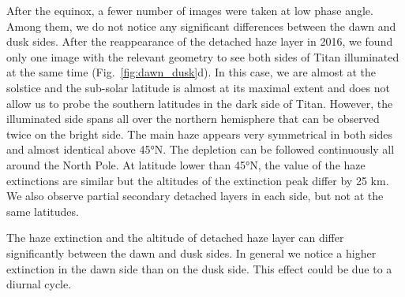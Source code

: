 After the equinox, a fewer number of images were taken at low phase angle. Among them, we do not notice any
significant differences between the dawn and dusk sides. After the reappearance of the detached haze layer in
2016, we found only one image with the relevant geometry to see both sides of Titan illuminated at the same time
(Fig.~\ref{fig:dawn_dusk}d). In this case, we are almost at the solstice and the sub-solar latitude is almost
at its maximal extent and does not allow us to probe the southern latitudes in the dark side of Titan.
However, the illuminated side spans all over the northern hemisphere that can
be observed twice on the bright side. The main haze appears very symmetrical in both sides and almost identical
above \ang{45}N. The depletion can be followed continuously all around the North Pole. At latitude lower than
\ang{45}N, the value of the haze extinctions are similar but the altitudes of the extinction peak differ by
25 km. We also observe partial secondary detached layers in each side, but not at the same latitudes.

The haze extinction and the altitude of detached haze layer can differ significantly between the dawn
and dusk sides. In general we notice a higher extinction in the dawn side than on the dusk side. This effect
could be due to a diurnal cycle.